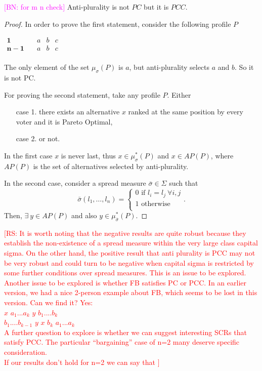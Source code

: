 \documentclass[version=3.21, pagesize, notitlepage, twoside=off, bibliography=totoc, DIV=calc, fontsize=11pt, a4paper]{scrartcl}
\newcommand{\commentBN}[1]{\textcolor{magenta}{\small$\big[$BN: #1$\big]$}}
\newcommand{\commentRS}[1]{\textcolor{red}{\small$\big[$RS: #1$\big]$}}
\newcommand{\musigma}{\mu_{\sigma}}
\newcommand{\mustar}{\mu_{\sigma}^*}
\begin{document}
\begin{proposition}
	\commentBN{for m n check} Anti-plurality is not $PC$ but it is $PCC$.
\end{proposition}
\begin{proof} 
	In order to prove the first statement, consider the following profile $P$
	\begin{center}
		$
		\begin{array}{cccc}
		\mathbf{1} \quad &a&b&c\\
		\mathbf{n-1} \quad &a&b&c\\
		\end{array}
		$
	\end{center}
	The only element of the set $\musigma(P)$ is $a$, but anti-plurality selects $a$ and $b$. So it is not PC.
	
	For proving the second statement, take any profile $P$. Either
	\begin{itemize}
		\item[case 1.] there exists an alternative $x$ ranked at the same position by every voter and it is Pareto Optimal,
		\item[case 2.] or not.
	\end{itemize}
	In the first case $x$ is never last, thus $x\in \mustar(P) $ and $ x \in AP(P)$, where $AP(P)$ is the set of alternatives selected by anti-plurality.
	
	In the second case, consider a spread measure $\bar{\sigma} \in \Sigma$ such that \[
	\bar{\sigma}(l_1, \dots,l_n)= \begin{cases}
	0 \text{ if } l_i=l_j \ \forall i,j \\ 1 \text{ otherwise} \\
	\end{cases}. \]
	Then, $\exists \ y \in AP(P)$ and also $ y \in \mu_{\bar{\sigma}}^*(P)$.
\end{proof}

\commentRS{ It is worth noting that the negative results are quite robust because they establish the non-existence of a spread measure within the very large class capital sigma. On the other hand, the positive result that anti plurality is PCC may not be very robust and could turn to be negative when capital sigma is restricted by some further conditions over spread measures. This is an issue to be explored. \\ Another issue to be explored is whether FB satisfies PC or PCC. In an earlier version, we had a nice 2-person example about FB, which seems to be lost in this version. Can we find it? Yes:	\bigskip \\ {\color{black}$x$ $a_{1}...a_{k}$ $y$ $b_{1}....b_{k}$ \\	$b_{1}....b_{k-1}$ $y$ $x$ $b_{k}$ $a_{1}...a_{k}$} \bigskip \\
A further question to explore is whether we can suggest interesting SCRs that satisfy PCC. The particular “bargaining” case of n=2 many deserve specific consideration. \bigskip \\
If our results don't hold for n=2 we can say that }
\newpage
\end{document}
